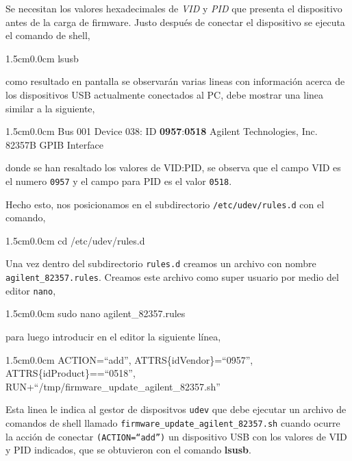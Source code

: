 \documentclass[paper=letter,oneside,fontsize=11pt, parskip=full]{scrartcl}
\newenvironment{code}
	{\begin{adjustwidth}{1.5cm}{0.0cm}\ttfamily}
	{\end{adjustwidth}}
\begin{document}
	Se necesitan los valores hexadecimales de \emph{VID} y \emph{PID} que presenta el dispositivo antes de la carga de firmware. Justo después de conectar el dispositivo se ejecuta el comando de shell,
		
	\begin{code}
		lsusb
	\end{code}

	como resultado en pantalla se observarán varias lineas con información acerca de los dispositivos USB actualmente conectados al PC, debe mostrar una linea similar a la siguiente,	

	\begin{code}
		Bus 001 Device 038: ID \textbf{0957}:\textbf{0518}
		Agilent Technologies, Inc. \\ 
		82357B GPIB Interface
	\end{code}

	donde se han resaltado los valores de VID:PID, se observa que el campo VID es el numero \texttt{0957} y el campo para PID es el valor \texttt{0518}.
	
	Hecho esto, nos posicionamos en el subdirectorio \texttt{/etc/udev/rules.d} con el comando,
	
	\begin{code}
		cd /etc/udev/rules.d
	\end{code}

	Una vez dentro del subdirectorio \texttt{rules.d} creamos un archivo con nombre \texttt{agilent\_82357.rules}. Creamos este archivo como super usuario por medio del editor \texttt{nano},
	
	\begin{code}
		sudo nano agilent\_82357.rules
	\end{code}
	
	para luego introducir en el editor la siguiente línea, 
	
	\begin{code}
		ACTION=``add'', ATTRS\{idVendor\}=``0957'', ATTRS\{idProduct\}==``0518'', \\ RUN+``/tmp/firmware\_update\_agilent\_82357.sh''		
	\end{code}

	Esta linea le indica al gestor de dispositvos \texttt{udev} que debe ejecutar un archivo de comandos de shell llamado \texttt{firmware\_update\_agilent\_82357.sh} cuando ocurre la acción de conectar \texttt{(ACTION=``add'')} un dispositivo USB con los valores de VID y PID indicados, que se obtuvieron con el comando \textbf{lsusb}. 	
	
\end{document}
